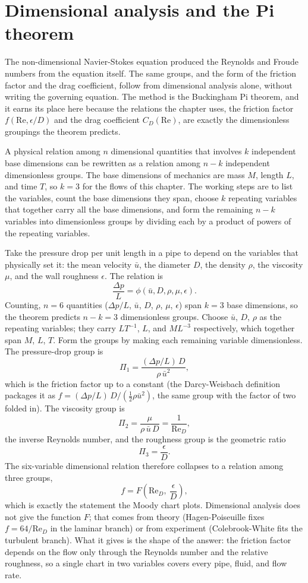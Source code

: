 \section{Dimensional analysis and the Pi theorem}

The non-dimensional Navier-Stokes equation produced the Reynolds and
Froude numbers from the equation itself. The same groups, and the form
of the friction factor and the drag coefficient, follow from
dimensional analysis alone, without writing the governing equation.
The method is the Buckingham Pi theorem, and it earns its place here
because the relations the chapter uses, the friction factor
$f(\text{Re},\epsilon/D)$ and the drag coefficient $C_D(\text{Re})$,
are exactly the dimensionless groupings the theorem predicts.

 A physical relation among $n$ dimensional
quantities that involves $k$ independent base dimensions can be
rewritten as a relation among $n - k$ independent dimensionless groups.
The base dimensions of mechanics are mass $M$, length $L$, and time
$T$, so $k = 3$ for the flows of this chapter. The working steps are to
list the variables, count the base dimensions they span, choose $k$
repeating variables that together carry all the base dimensions, and
form the remaining $n - k$ variables into dimensionless groups by
dividing each by a product of powers of the repeating variables.

 Take the pressure drop per unit
length in a pipe to depend on the variables that physically set it: the
mean velocity $\bar u$, the diameter $D$, the density $\rho$, the
viscosity $\mu$, and the wall roughness $\epsilon$. The relation is
\[
\frac{\Delta p}{L} = \phi(\bar u, D, \rho, \mu, \epsilon).
\]
Counting, $n = 6$ quantities ($\Delta p/L$, $\bar u$, $D$, $\rho$,
$\mu$, $\epsilon$) span $k = 3$ base dimensions, so the theorem
predicts $n - k = 3$ dimensionless groups. Choose $\bar u$, $D$, $\rho$
as the repeating variables; they carry $L T^{-1}$, $L$, and $M L^{-3}$
respectively, which together span $M$, $L$, $T$. Form the groups by
making each remaining variable dimensionless. The pressure-drop group
is
\[
\Pi_1 = \frac{(\Delta p/L)\,D}{\rho\,\bar u^2},
\]
which is the friction factor up to a constant (the Darcy-Weisbach
definition packages it as $f = (\Delta p/L)\,D/(\tfrac12\rho\bar u^2)$,
the same group with the factor of two folded in). The viscosity group
is
\[
\Pi_2 = \frac{\mu}{\rho\,\bar u\,D} = \frac{1}{\text{Re}_D},
\]
the inverse Reynolds number, and the roughness group is the geometric
ratio
\[
\Pi_3 = \frac{\epsilon}{D}.
\]
The six-variable dimensional relation therefore collapses to a relation
among three groups,
\[
f = F\!\left(\text{Re}_D,\ \frac{\epsilon}{D}\right),
\]
which is exactly the statement the Moody chart plots. Dimensional
analysis does not give the function $F$; that comes from theory
(Hagen-Poiseuille fixes $f = 64/\text{Re}_D$ in the laminar branch) or
from experiment (Colebrook-White fits the turbulent branch). What it
gives is the shape of the answer: the friction factor depends on the
flow only through the Reynolds number and the relative roughness, so a
single chart in two variables covers every pipe, fluid, and flow rate.

